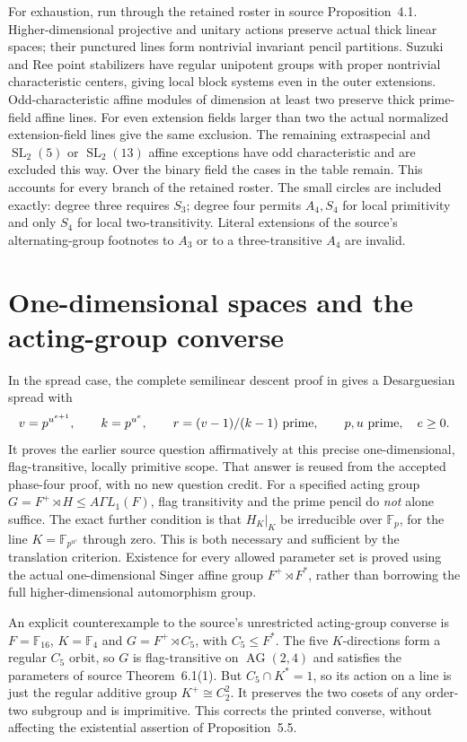 \documentclass[11pt,a4paper]{article}
\newcommand{\F}{\mathbb F}
\begin{document}
For exhaustion, run through the retained roster in source
Proposition~4.1. Higher-dimensional projective and unitary actions
preserve actual thick linear spaces; their punctured lines form
nontrivial invariant pencil partitions. Suzuki and Ree point stabilizers
have regular unipotent groups with proper nontrivial characteristic
centers, giving local block systems even in the outer extensions.
Odd-characteristic affine modules of dimension at least two preserve
thick prime-field affine lines. For even extension fields larger than
two the actual normalized extension-field lines give the same
exclusion. The remaining extraspecial and $\operatorname{SL}_2(5)$
or $\operatorname{SL}_2(13)$ affine exceptions have odd characteristic
and are excluded this way. Over the binary field the cases in the
table remain. This accounts for every branch of the retained roster.
The small circles are included exactly: degree three requires $S_3$;
degree four permits $A_4,S_4$ for local primitivity and only $S_4$
for local two-transitivity. Literal extensions of the source's
alternating-group footnotes to $A_3$ or to a three-transitive $A_4$
are invalid.

\section{One-dimensional spaces and the acting-group converse}
In the spread case, the complete semilinear descent proof in
\cite[Theorem~\ref{U-spread}]{U} gives a Desarguesian spread with
\[
 v=p^{u^{e+1}},\qquad k=p^{u^e},\qquad
 r=(v-1)/(k-1)\ \hbox{prime},\qquad p,u\ \hbox{prime},\quad e\geq0.
\]
It proves the earlier source question affirmatively at this precise
one-dimensional, flag-transitive, locally primitive scope. That answer
is reused from the accepted phase-four proof, with no new question credit.
For a specified acting group $G=F^+\rtimes H\leq A\Gamma L_1(F)$,
flag transitivity and the prime pencil do \emph{not} alone suffice.
The exact further condition is that $H_K|_K$ be irreducible over
$\F_p$, for the line $K=\F_{p^{u^e}}$ through zero. This is both
necessary and sufficient by the translation criterion. Existence for
every allowed parameter set is proved using the actual one-dimensional
Singer affine group $F^+\rtimes F^*$, rather than borrowing the full
higher-dimensional automorphism group.

An explicit counterexample to the source's unrestricted acting-group
converse is $F=\F_{16}$, $K=\F_4$ and
$G=F^+\rtimes C_5$, with $C_5\leq F^*$.
The five $K$-directions form a regular $C_5$ orbit, so $G$ is
flag-transitive on $\operatorname{AG}(2,4)$ and satisfies the
parameters of source Theorem~6.1(1). But
$C_5\cap K^*=1$, so its action on a line is just the regular
additive group $K^+\cong C_2^2$. It preserves the two cosets of any
order-two subgroup and is imprimitive. This corrects the printed
converse, without affecting the existential assertion of Proposition~5.5.
\end{document}
